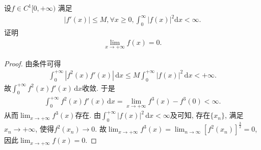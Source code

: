 \documentclass[../../main.tex]{subfiles}%
\begin{document}
\begin{example}
设$f \in C^1[0, +\infty)$ 满足
\begin{align*}
|f'(x)| \leqslant M, \forall x \geqslant 0, \int_0^{\infty} |f(x)|^2 \mathrm{d}x < \infty.
\end{align*}
证明
\begin{align*}
\lim_{x \to +\infty} f(x) = 0.
\end{align*}
\end{example}
\begin{proof}

由条件可得
\begin{align*}
\int_0^{+\infty} \left| f^2(x) f'(x) \right| \, \mathrm{d}x \leqslant M \int_0^{+\infty} \left| f(x) \right|^2 \, \mathrm{d}x < +\infty.
\end{align*}
故$\int_0^{+\infty} f^2(x) f'(x) \, \mathrm{d}x$收敛. 于是
\begin{align*}
\int_0^{+\infty} f^2(x) f'(x) \, \mathrm{d}x = \lim_{x \to +\infty} f^3(x) - f^3(0) < \infty.
\end{align*}
从而$\lim_{x \to +\infty} f^3(x)$存在. 由$\int_0^{+\infty} \left| f(x) \right|^2 \, \mathrm{d}x < \infty$及可知, 存在$\{x_n\}$, 满足$x_n \to +\infty$, 使得$f^2(x_n) \to 0$.
故$\lim_{x\rightarrow +\infty} f^3(x)=\lim_{n\rightarrow \infty} \left[ f^2(x_n) \right] ^{\frac{3}{2}}=0$, 因此$\lim_{x \to +\infty} f(x) = 0$.

\end{proof}
\end{document}
